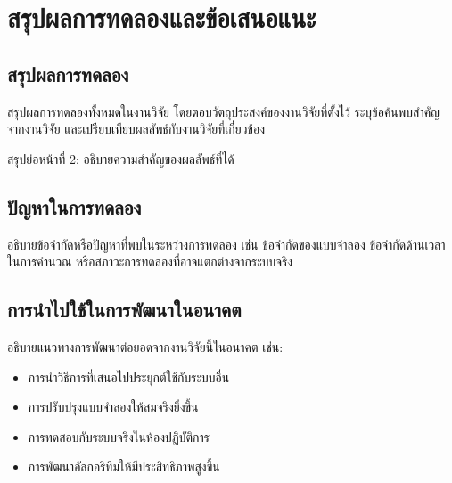 
\chapter{สรุปผลการทดลองและข้อเสนอแนะ}

\section{สรุปผลการทดลอง}

\noindent\hspace{\parindent}%
สรุปผลการทดลองทั้งหมดในงานวิจัย โดยตอบวัตถุประสงค์ของงานวิจัยที่ตั้งไว้
ระบุข้อค้นพบสำคัญจากงานวิจัย และเปรียบเทียบผลลัพธ์กับงานวิจัยที่เกี่ยวข้อง

\noindent\hspace{\parindent}%
สรุปย่อหน้าที่ 2: อธิบายความสำคัญของผลลัพธ์ที่ได้

\section{ปัญหาในการทดลอง}

\noindent\hspace{\parindent}%
อธิบายข้อจำกัดหรือปัญหาที่พบในระหว่างการทดลอง เช่น ข้อจำกัดของแบบจำลอง
ข้อจำกัดด้านเวลาในการคำนวณ หรือสภาวะการทดลองที่อาจแตกต่างจากระบบจริง

\section{การนำไปใช้ในการพัฒนาในอนาคต}

\noindent\hspace{\parindent}%
อธิบายแนวทางการพัฒนาต่อยอดจากงานวิจัยนี้ในอนาคต เช่น:
\begin{itemize}
  \item การนำวิธีการที่เสนอไปประยุกต์ใช้กับระบบอื่น
  \item การปรับปรุงแบบจำลองให้สมจริงยิ่งขึ้น
  \item การทดสอบกับระบบจริงในห้องปฏิบัติการ
  \item การพัฒนาอัลกอริทึมให้มีประสิทธิภาพสูงขึ้น
\end{itemize}
